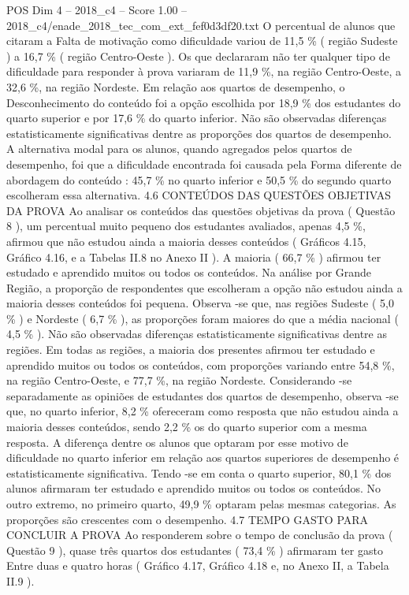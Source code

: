 \begin{textsample}{POS Dim 4 – 2018\_c4 – Score 1.00 – 2018\_c4/enade\_2018\_tec\_com\_ext\_fef0d3df20.txt}
O percentual de alunos que citaram a Falta de motivação como dificuldade variou de 11,5 \% ( região Sudeste ) a 16,7 \% ( região Centro-Oeste ).
Os que declararam não ter qualquer tipo de dificuldade para responder à prova variaram de 11,9 \%, na região Centro-Oeste, a 32,6 \%, na região Nordeste.
Em relação aos quartos de desempenho, o Desconhecimento do conteúdo foi a opção escolhida por 18,9 \% dos estudantes do quarto superior e por 17,6 \% do quarto inferior.
Não são observadas diferenças estatisticamente significativas dentre as proporções dos quartos de desempenho.
A alternativa modal para os alunos, quando agregados pelos quartos de desempenho, foi que a dificuldade encontrada foi causada pela Forma diferente de abordagem do conteúdo : 45,7 \% no quarto inferior e 50,5 \% do segundo quarto escolheram essa alternativa. 4.6 CONTEÚDOS DAS QUESTÕES OBJETIVAS DA PROVA Ao analisar os conteúdos das questões objetivas da prova ( Questão 8 ), um percentual muito pequeno dos estudantes avaliados, apenas 4,5 \%, afirmou que não estudou ainda a maioria desses conteúdos ( Gráficos 4.15, Gráfico 4.16, e a Tabelas II.8 no Anexo II ).
A maioria ( 66,7 \% ) afirmou ter estudado e aprendido muitos ou todos os conteúdos.
Na análise por Grande Região, a proporção de respondentes que escolheram a opção não estudou ainda a maioria desses conteúdos foi pequena.
Observa -se que, nas regiões Sudeste ( 5,0 \% ) e Nordeste ( 6,7 \% ), as proporções foram maiores do que a média nacional ( 4,5 \% ).
Não são observadas diferenças estatisticamente significativas dentre as regiões.
Em todas as regiões, a maioria dos presentes afirmou ter estudado e aprendido muitos ou todos os conteúdos, com proporções variando entre 54,8 \%, na região Centro-Oeste, e 77,7 \%, na região Nordeste.
Considerando -se separadamente as opiniões de estudantes dos quartos de desempenho, observa -se que, no quarto inferior, 8,2 \% ofereceram como resposta que não estudou ainda a maioria desses conteúdos, sendo 2,2 \% os do quarto superior com a mesma resposta.
A diferença dentre os alunos que optaram por esse motivo de dificuldade no quarto inferior em relação aos quartos superiores de desempenho é estatisticamente significativa.
Tendo -se em conta o quarto superior, 80,1 \% dos alunos afirmaram ter estudado e aprendido muitos ou todos os conteúdos.
No outro extremo, no primeiro quarto, 49,9 \% optaram pelas mesmas categorias.
As proporções são crescentes com o desempenho. 4.7 TEMPO GASTO PARA CONCLUIR A PROVA Ao responderem sobre o tempo de conclusão da prova ( Questão 9 ), quase três quartos dos estudantes ( 73,4 \% ) afirmaram ter gasto Entre duas e quatro horas ( Gráfico 4.17, Gráfico 4.18 e, no Anexo II, a Tabela II.9 ).

\end{textsample}
